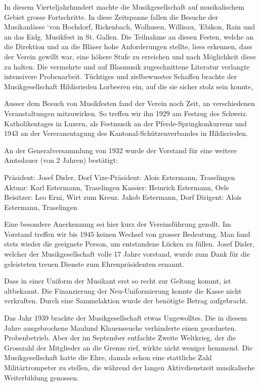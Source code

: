 \begin{history}

    In diesem Vierteljahrhundert machte die Musikgesellschaft auf musikalischem
    Gebiet grosse Fortschritte. In diese Zeitspanne fallen die Besuche der
    Musikanlässe ‘von Hochdorf, Rickenbach, Wolhusen, Willisau, 'Ebikon, Rain
    und an das Eidg. Musikfest in St. Gallen. Die Teilnahme an diesen Festen,
    welche an die Direktion und an die Bläser hohe Anforderungen stellte, liess
    erkennen, dass der Verein gewillt war, eine höhere Stufe zu erreichen und
    nach Möglichkeit diese zu halten. Die vermehrte und auf Blasmusik
    zugeschnittene Literatur verlangte intensivere Probenarbeit. Tüchtiges und
    zielbewusstes Schaffen brachte der Musikgesellschaft Hildisrieden Lorbeeren
    ein, auf die sie sicher stolz sein konnte,

    Ausser dem Besuch von Musikfesten fand der Verein noch Zeit, an
    verschiedenen Veranstaltungen mitzuwirken. So treffen wir ihn 1929 am
    Festzug des Schweiz. Katholikentages in Luzern, als Festmusik an der
    Pferde-Springkonkurrenz und 1943 an der Vereranentagung des
    Kantonal-Schützenverbandes in Hildisrieden.

    An der Generalversammlung von 1932 wurde der Vorstand für eine weitere
    Amtsdauer (von 2 Jahren) bestätigt:

    Präsident: Josef Disler, Dorf Vize-Präsident: Alois Estermann, Traselingen
    Aktuar: Karl Estermann, Traselingen Kassier: Heinrich Estermann, Oele
    Beisitzer: Leo Erni, Wirt zum Kreuz. Jakob Estermann, Dorf Dirigent: Alois
    Estermann, Traselingen


    Eine besondere Anerkennung sei hier kurz der Vereinsführung gezollt. Im
    Vorstand treffen wir bis 1945 keinen Wechsel von grosser Bedeutung. Man fand
    stets wieder die geeignete Person, um entstandene Lücken zu füllen. Josef
    Disler, welcher der Musikgesellschaft volle 17 Jahre vorstand, wurde zum
    Dank für die geleisteten treuen Dienste zum Ehrenpräsidenten ernannt.

    Dass in einer Uniform der Musikant erst so recht zur Geltung kommt, ist
    altbekannt. Die Finanzierung der Neu-Uniformierung konnte die Kasse nicht
    verkraften. Durch eine Sammelaktion wurde der benötigte Betrag aufgebracht.

    Das Jahr 1939 brachte der Musikgesellschaft etwas Ungewolltes. Die in diesem
    Jahre ausgebrochene Maulund Klauenseuche verhinderte einen geordneten.
    Probenbetrieb. Aber der im September entfachte Zweite Weltkrieg, der die
    Grosszahl der Mitglieder an die Grenze rief, wirkte nicht weniger hemmend.
    Die Musikgesellschaft hatte die Ehre, damals schon eine stattliche Zahl
    Militärtrompeter zu stellen, die während der langen Aktivdienstzeit
    musikalische Weiterbildung genossen.


\end{history}
